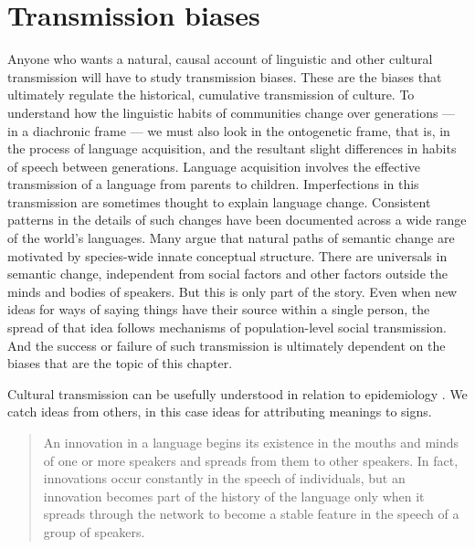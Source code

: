 
\chapter{Transmission biases}
\label{Transmission biases}



Anyone who wants a natural, causal account of linguistic and other cultural transmission will have to study transmission biases. These are the biases that ultimately regulate the historical, cumulative transmission of culture. To understand how the linguistic habits of communities change over generations --- in a diachronic frame --- we must also look in the ontogenetic frame, that is, in the process of language acquisition, and the resultant slight differences in habits of speech between generations. Language acquisition involves the effective transmission of a language from parents to children. Imperfections in this transmission are sometimes thought to explain language change. Consistent patterns in the details of such changes have been documented across a wide range of the world's languages. Many argue that natural paths of semantic change are motivated by species-wide innate conceptual structure. There are universals in semantic change, independent from social factors and other factors outside the minds and bodies of speakers. But this is only part of the story. Even when new ideas for ways of saying things have their source within a single person, the spread of that idea follows mechanisms of population-level social transmission. And the success or failure of such transmission is ultimately dependent on the biases that are the topic of this chapter.

Cultural transmission can be usefully understood in relation to epidemiology \citep{dawkins_selfish_1976,sperber_anthropology_1985}. We catch ideas from others, in this case ideas for attributing meanings to signs.


\begin{quotation}
	An innovation in a language begins its existence in the mouths and minds of one or more speakers and spreads from them to other speakers. In fact, innovations occur constantly in the speech of individuals, but an innovation becomes part of the history of the language only when it spreads through the network to become a stable feature in the speech of a group of speakers. \citep[214--215]{ross_social_1997} 

\end{quotation}
	
